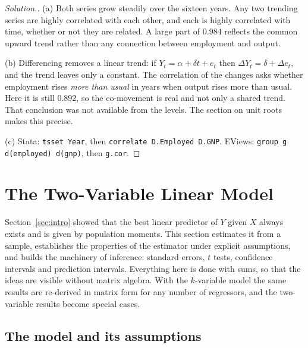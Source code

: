 \documentclass[11pt,a4paper]{article}
\numberwithin{equation}{section}
\theoremstyle{definition}
\newenvironment{solution}
  {\renewcommand{\qedsymbol}{}\begin{proof}[\textit{Solution}.]}
  {\end{proof}}
\begin{document}
\begin{solution}
(a) Both series grow steadily over the sixteen years. Any two trending series are highly correlated with each other, and each is highly
correlated with time, whether or not they are related. A large part of $0.984$ reflects the common upward trend rather than any connection
between employment and output.

(b) Differencing removes a linear trend: if $Y_t = \alpha + \delta t + e_t$ then $\Delta Y_t = \delta + \Delta e_t$, and the trend leaves only a constant.
The correlation of the changes asks whether employment rises \emph{more than usual} in years when output rises more than usual. Here it is still
$0.892$, so the co-movement is real and not only a shared trend. That conclusion was not available from the levels. The section on unit roots makes this
precise.

(c) Stata: \texttt{tsset Year}, then \texttt{correlate D.Employed D.GNP}. EViews: \texttt{group g d(employed) d(gnp)}, then \texttt{g.cor}.
\end{solution}

\section{The Two-Variable Linear Model}
\label{sec:twovar}

Section~\ref{sec:intro} showed that the best linear predictor of $Y$ given $X$ always exists and is given by population moments. This section
estimates it from a sample, establishes the properties of the estimator under explicit assumptions, and builds the machinery of inference: standard
errors, $t$ tests, confidence intervals and prediction intervals. Everything here is done with sums, so that the ideas are visible without
matrix algebra. With the $k$-variable model the same results are re-derived in matrix form for any number of regressors, and the two-variable
results become special cases.

\subsection{The model and its assumptions}
\label{ssec:assump2}
\end{document}
